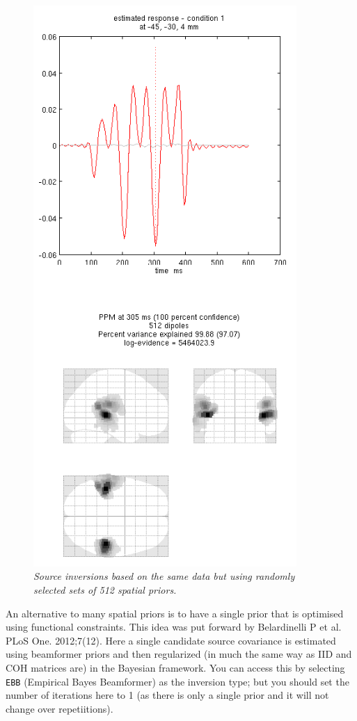 \begin{figure}
\begin{center}
\includegraphics[width=100mm]{meg_sloc/slide7}
\caption{\em  Source inversions based on the same data but using randomly selected sets of 512 spatial priors.\label{meg_sloc:fig:7}}
\end{center}
\end{figure}


An alternative to many spatial priors is to have a single prior that is optimised using functional constraints. This idea was put forward by Belardinelli P et al. PLoS One. 2012;7(12). Here a single candidate source covariance is estimated using beamformer priors and then regularized (in much the same way as IID and COH matrices are) in the Bayesian framework. You can access this by selecting \texttt{EBB} (Empirical Bayes Beamformer) as the inversion type; but you should set the number of iterations here to 1 (as there is only a single prior and it will not change over repetiitions).

